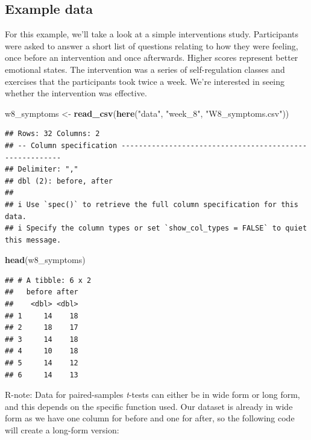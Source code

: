 \documentclass[
]{book}
\newenvironment{Shaded}{\begin{snugshade}}{\end{snugshade}}
\newcommand{\FunctionTok}[1]{\textcolor[rgb]{0.13,0.29,0.53}{\textbf{#1}}}
\newcommand{\NormalTok}[1]{#1}
\newcommand{\OtherTok}[1]{\textcolor[rgb]{0.56,0.35,0.01}{#1}}
\newcommand{\StringTok}[1]{\textcolor[rgb]{0.31,0.60,0.02}{#1}}
\begin{document}
\hypertarget{example-data-2}{%
\subsection{Example data}\label{example-data-2}}

For this example, we'll take a look at a simple interventions study. Participants were asked to answer a short list of questions relating to how they were feeling, once before an intervention and once afterwards. Higher scores represent better emotional states. The intervention was a series of self-regulation classes and exercises that the participants took twice a week. We're interested in seeing whether the intervention was effective.

\begin{Shaded}
\begin{Highlighting}[]
\NormalTok{w8\_symptoms }\OtherTok{\textless{}{-}} \FunctionTok{read\_csv}\NormalTok{(}\FunctionTok{here}\NormalTok{(}\StringTok{"data"}\NormalTok{, }\StringTok{"week\_8"}\NormalTok{, }\StringTok{"W8\_symptoms.csv"}\NormalTok{))}
\end{Highlighting}
\end{Shaded}

\begin{verbatim}
## Rows: 32 Columns: 2
## -- Column specification --------------------------------------------------------
## Delimiter: ","
## dbl (2): before, after
## 
## i Use `spec()` to retrieve the full column specification for this data.
## i Specify the column types or set `show_col_types = FALSE` to quiet this message.
\end{verbatim}

\begin{Shaded}
\begin{Highlighting}[]
\FunctionTok{head}\NormalTok{(w8\_symptoms)}
\end{Highlighting}
\end{Shaded}

\begin{verbatim}
## # A tibble: 6 x 2
##   before after
##    <dbl> <dbl>
## 1     14    18
## 2     18    17
## 3     14    18
## 4     10    18
## 5     14    12
## 6     14    13
\end{verbatim}

R-note: Data for paired-samples \emph{t}-tests can either be in wide form or long form, and this depends on the specific function used. Our dataset is already in wide form as we have one column for before and one for after, so the following code will create a long-form version:
\end{document}
